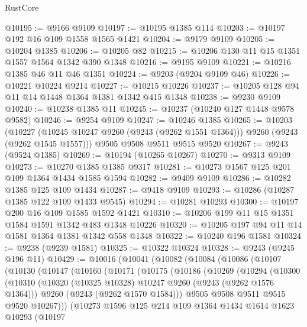 \begin{lexlean}{RustCore}
\begin{coremodule}
@10195 := @9166 @9109
@10197 := @10195 @1385 @114
@10203 := @10197 @192 @16 @109 @1558 @1565 @1421
@10204 := @9179 @9109
@10205 := @10204 @1385
@10206 := @10205 @82
@10215 := @10206 @130 @11 @15 @1351 @1557 @1564 @1342 @390 @1348
@10216 := @9195 @9109
@10221 := @10216 @1385 @46 @11 @46 @1351
@10224 := @9203 (@9204 @9109 @46)
@10226 := @10221 @10224 @9214
@10227 := @10215 @10226
@10237 := @10205 @128 @94 @11 @14 @1448 @1364 @1381 @1342 @415 @1348
@10238 := @9230 @9109
@10240 := @10238 @1385 @11
@10245 := @10237 (@10240 @127 @1448 @9578 @9582)
@10246 := @9254 @9109
@10247 := @10246 @1385
@10265 := @10203
    (@10227 (@10245 @10247 @9260 (@9243 (@9262 @1551 @1364))) @9260 (@9243 (@9262 @1545 @1557)))
    @9505
    @9508
    @9511
    @9515
    @9520
@10267 := @9243 (@9524 @1385)
@10269 := @10194 (@10265 @10267)
@10270 := @9313 @9109
@10273 := @10270 @1385 @1385 @9317
@10281 := @10273 @1567 @125 @201 @109 @1364 @1434 @1585 @1594
@10282 := @9409 @9109
@10286 := @10282 @1385 @125 @109 @1434
@10287 := @9418 @9109
@10293 := @10286 (@10287 @1385 @122 @109 @1433 @9545)
@10294 := @10281 @10293
@10300 := @10197 @200 @16 @109 @1585 @1592 @1421
@10310 := @10206 @199 @11 @15 @1351 @1584 @1591 @1342 @483 @1348 @10226
@10320 := @10205 @197 @94 @11 @14 @1581 @1364 @1381 @1342 @558 @1348
@10322 := @10240 @196 @1581
@10324 := @9238 (@9239 @1581)
@10325 := @10322 @10324
@10328 := @9243 (@9245 @196 @11)
@10429 := @10016
    (@10041
      (@10082
        (@10084
          (@10086
            (@10107
              (@10130
                (@10147
                  (@10160
                    (@10171
                      (@10175
                        (@10186
                          (@10269
                            (@10294
                              (@10300
                                (@10310
                                  (@10320 (@10325 @10328) @10247 @9260 (@9243 (@9262 @1576 @1364)))
                                  @9260
                                  (@9243 (@9262 @1570 @1584)))
                                @9505
                                @9508
                                @9511
                                @9515
                                @9520
                                @10267)))
                          (@10273
                            @1596
                            @125
                            @214
                            @109
                            @1364
                            @1434
                            @1614
                            @1623
                            @10293
                            (@10197

\end{coremodule}
\end{lexlean}
